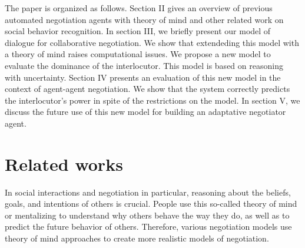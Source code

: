 \documentclass[conference, letterpaper]{IEEEtran}
\begin{document}
	The paper is organized as follows. Section II gives an overview of previous automated negotiation agents with theory of mind and other related work on social behavior recognition. In section III, we briefly present our model of dialogue for collaborative negotiation. We show that extendeding this model with a theory of mind raises computational issues. We propose a new model to evaluate the dominance of the interlocutor. This model is based on reasoning with uncertainty. Section IV presents an evaluation of this new model in the context of agent-agent negotiation. We show that the system correctly predicts the interlocutor's power in spite of the restrictions on the model. In section V, we discuss the future use of this new model for building an adaptative negotiator agent.
	
	
	\section{Related works}
	
	In social interactions and negotiation in particular, reasoning about the beliefs, goals, and intentions of others is crucial. People use this so-called theory of mind \cite{premack1978does} or mentalizing to understand why others behave the way they do, as well as to predict the future behavior of others. Therefore, various negotiation models use theory of mind approaches to create  more realistic models of negotiation. 
	
\end{document}
